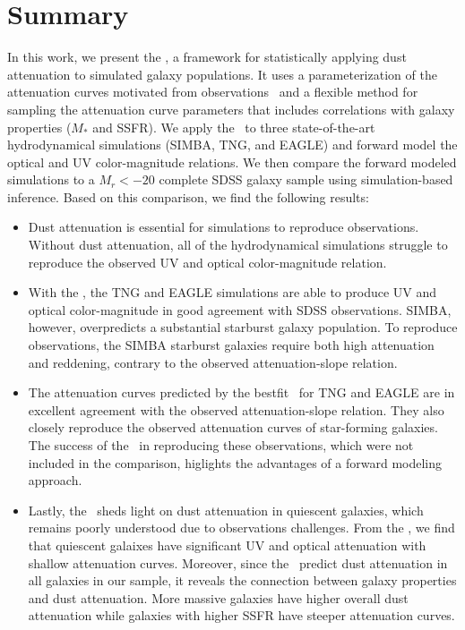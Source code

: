 \section{Summary}
In this work, we present the \eda, a framework for statistically applying dust
attenuation to simulated galaxy populations. It uses a parameterization of 
the attenuation curves motivated from observations~\citep{noll2009} and a
flexible method for sampling the attenuation curve parameters that includes
correlations with galaxy properties ($M_*$ and SSFR). We apply the \eda~to 
three state-of-the-art hydrodynamical simulations (SIMBA, TNG, and EAGLE) and
forward model the optical and UV color-magnitude relations. We then compare
the forward modeled simulations to a $M_r < -20$ complete SDSS galaxy sample  
using simulation-based inference. Based on this comparison, we find the
following results: 

\begin{itemize}
    \item Dust attenuation is essential for simulations to reproduce observations.
        Without dust attenuation, all of the hydrodynamical simulations struggle
        to reproduce the observed UV and optical color-magnitude relation. 
    \item With the \eda, the TNG and EAGLE simulations are able to produce UV and
        optical color-magnitude in good agreement with SDSS observations. SIMBA,
        however, overpredicts a substantial starburst galaxy population. To 
        reproduce observations, the SIMBA starburst galaxies require both high
        attenuation and reddening, contrary to the observed attenuation-slope
        relation. 
    \item The attenuation curves predicted by the bestfit \eda~for TNG and
        EAGLE are in excellent agreement with the observed attenuation-slope
        relation. They also closely reproduce the observed attenuation curves
        of star-forming galaxies. The success of the \eda~in reproducing these
        observations, which were not included in the comparison, higlights the 
        advantages of a forward modeling approach. 
    \item Lastly, the \eda~sheds light on dust attenuation in quiescent
        galaxies, which remains poorly understood due to observations
        challenges. From the \eda, we find that quiescent galaixes have
        significant UV and optical attenuation with shallow attenuation curves.
        Moreover, since the \eda~predict dust attenuation in all galaxies in
        our sample, it reveals the connection between galaxy properties and
        dust attenuation. More massive galaxies have higher overall dust
        attenuation while galaxies with higher SSFR have steeper attenuation
        curves. 
\end{itemize}

